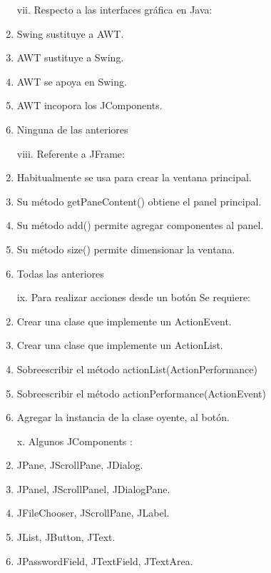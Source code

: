 \documentclass[10pt]{article}
\begin{document}
{\begin{enumerate}
\begin{multicols}{2}
    \begin{enumerate}[label=(\alph*)]
        \item[vii.] Respecto a las interfaces gr\'afica en Java:
        \item Swing sustituye a AWT.
        \item AWT sustituye a Swing.
        \item AWT se apoya en Swing.
        \item AWT incopora los JComponents.
        \item Ninguna de las anteriores
    \end{enumerate}

    \begin{enumerate}[label=(\alph*)]
        \item[viii.] Referente a JFrame:
        \item Habitualmente se usa para crear la ventana principal.
        \item Su m\'etodo getPaneContent() obtiene el panel principal.
        \item Su m\'etodo add() permite agregar componentes al panel.
        \item Su m\'etodo size() permite dimensionar la ventana.
        \item Todas las anteriores
    \end{enumerate}

    \begin{enumerate}[label=(\alph*)]
        \item[ix.] Para realizar acciones desde un bot\'on Se requiere:
        \item Crear una clase que implemente un ActionEvent.
        \item Crear una clase que implemente un ActionList.
        \item Sobreescribir el m\'etodo actionList(ActionPerformance)
        \item Sobreescribir el m\'etodo actionPerformance(ActionEvent)
        \item Agregar la instancia de la clase oyente, al bot\'on.
    \end{enumerate}
    
    \begin{enumerate}[label=(\alph*)]
        \item[x.] Algunos JComponents : 
        \item JPane, JScrollPane, JDialog.
        \item JPanel, JScrollPanel, JDialogPane.
        \item JFileChooser, JScrollPane, JLabel.
        \item JList, JButton, JText.
        \item JPasswordField, JTextField, JTextArea.
    \end{enumerate}


\end{multicols}
\end{enumerate}}
\end{document}

